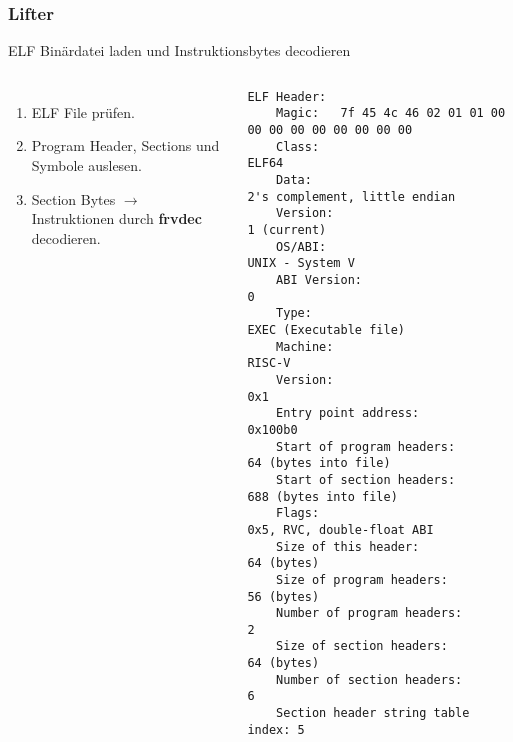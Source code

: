 \begin{frame}[fragile]
    \frametitle{Lifter}{ELF Binärdatei laden und Instruktionsbytes decodieren}
    \pause
    \begin{columns}[c]

        \begin{enumerate}
            \item ELF File prüfen.
                  \pause
            \item Program Header, Sections und Symbole auslesen.
                  \pause
            \item Section Bytes $\rightarrow$ Instruktionen durch \textbf{frvdec} decodieren.
        \end{enumerate}
        \pause
        \begin{lstlisting}[basicstyle=\footnotesize, breaklines=true]
ELF Header:
    Magic:   7f 45 4c 46 02 01 01 00 00 00 00 00 00 00 00 00 
    Class:                             ELF64
    Data:                              2's complement, little endian
    Version:                           1 (current)
    OS/ABI:                            UNIX - System V
    ABI Version:                       0
    Type:                              EXEC (Executable file)
    Machine:                           RISC-V
    Version:                           0x1
    Entry point address:               0x100b0
    Start of program headers:          64 (bytes into file)
    Start of section headers:          688 (bytes into file)
    Flags:                             0x5, RVC, double-float ABI
    Size of this header:               64 (bytes)
    Size of program headers:           56 (bytes)
    Number of program headers:         2
    Size of section headers:           64 (bytes)
    Number of section headers:         6
    Section header string table index: 5
        \end{lstlisting}
    \end{columns}
\end{frame}
\clearpage



